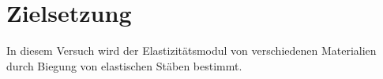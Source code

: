 \section{Zielsetzung}
\label{sec:Zielsetzung}


In diesem Versuch wird der Elastizitätsmodul von verschiedenen Materialien durch Biegung von elastischen Stäben bestimmt.
